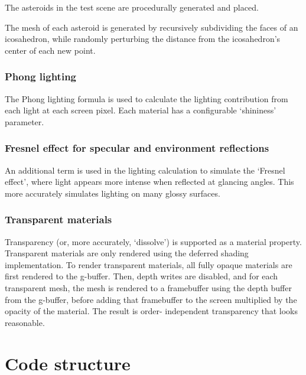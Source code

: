 \documentclass[11pt]{scrartcl} %
\begin{document}
            The asteroids in the test scene are procedurally generated and
            placed.

            The mesh of each asteroid is generated by recursively subdividing
            the faces of an icosahedron, while randomly perturbing the distance
            from the icosahedron's center of each new point.

        \subsubsection{Phong lighting}

            The Phong lighting formula is used to calculate the lighting
            contribution from each light at each screen pixel. Each material
            has a configurable `shininess' parameter.

        \subsubsection{Fresnel effect for specular and environment reflections}

            An additional term is used in the lighting calculation to simulate
            the `Fresnel effect', where light appears more intense when
            reflected at glancing angles. This more accurately simulates
            lighting on many glossy surfaces.

        \subsubsection{Transparent materials}

            Transparency (or, more accurately, `dissolve') is supported as a
            material property. Transparent materials are only rendered using
            the deferred shading implementation. To render transparent
            materials, all fully opaque materials are first rendered to the
            g-buffer. Then, depth writes are disabled, and for each transparent
            mesh, the mesh is rendered to a framebuffer using the depth buffer
            from the g-buffer, before adding that framebuffer to the screen
            multiplied by the opacity of the material. The result is order-
            independent transparency that looks reasonable.


\section{Code structure}
\end{document}
